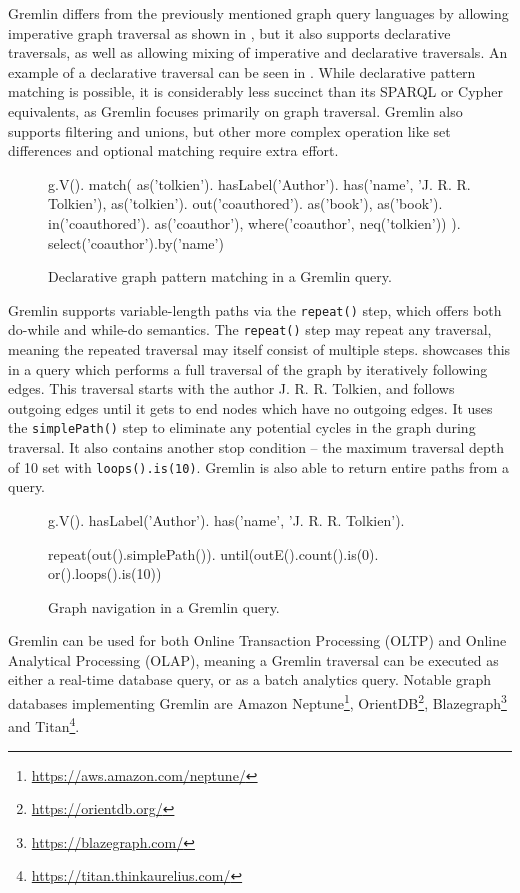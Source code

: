 Gremlin differs from the previously mentioned graph query languages by allowing imperative graph traversal as shown in , but it also supports declarative traversals, as well as allowing mixing of imperative and declarative traversals.
An example of a declarative traversal can be seen in .
While declarative pattern matching is possible, it is considerably less succinct than its SPARQL or Cypher equivalents, as Gremlin focuses primarily on graph traversal.
Gremlin also supports filtering and unions, but other more complex operation like set differences and optional matching require extra effort.

\begin{figure}[ht]
\begin{code}[]
g.V().
    match(
        as('tolkien').
            hasLabel('Author').
            has('name', 'J. R. R. Tolkien'),
        as('tolkien').
            out('coauthored').
            as('book'),
        as('book').
            in('coauthored').
            as('coauthor'),
        where('coauthor', neq('tolkien'))
    ).
    select('coauthor').by('name')
\end{code}
\caption{Declarative graph pattern matching in a Gremlin query.}
\label{fig:gremlinpattern}
\end{figure}

Gremlin supports variable-length paths via the \texttt{repeat()} step, which offers both do-while and while-do semantics.
The \texttt{repeat()} step may repeat any traversal, meaning the repeated traversal may itself consist of multiple steps.
 showcases this in a query which performs a full traversal of the graph by iteratively following edges.
This traversal starts with the author J. R. R. Tolkien, and follows outgoing edges until it gets to end nodes which have no outgoing edges.
It uses the \texttt{simplePath()} step to eliminate any potential cycles in the graph during traversal.
It also contains another stop condition -- the maximum traversal depth of 10 set with \texttt{loops().is(10)}.
Gremlin is also able to return entire paths from a query.

\begin{figure}[ht]
\begin{code}[]
g.V().
    hasLabel('Author').
    has('name', 'J. R. R. Tolkien').
    
    repeat(out().simplePath()).
        until(outE().count().is(0).
            or().loops().is(10))
\end{code}
\caption{Graph navigation in a Gremlin query.}
\label{fig:gremlinnav}
\end{figure}

Gremlin can be used for both Online Transaction Processing (OLTP) and Online Analytical Processing (OLAP), meaning a Gremlin traversal can be executed as either a real-time database query, or as a batch analytics query.
Notable graph databases implementing Gremlin are Amazon Neptune\footnote{\url{https://aws.amazon.com/neptune/}}, OrientDB\footnote{\url{https://orientdb.org/}}, Blazegraph\footnote{\url{https://blazegraph.com/}} and Titan\footnote{\url{https://titan.thinkaurelius.com/}}.
